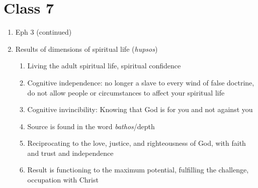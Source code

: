 \documentclass[11pt]{article}
\begin{document}
\section*{Class 7}
\begin{enumerate}
	\item Eph 3 (continued)
	\item Results of dimensions of spiritual life (\emph{hupsos})
	\begin{enumerate}
		\item Living the adult spiritual life, spiritual confidence
		\item Cognitive independence: no longer a slave to every wind of false doctrine, do not allow people or circumstances to affect your spiritual life
		\item Cognitive invincibility: Knowing that God is for you and not against you
		\item Source is found in the word \emph{bathos}/depth
		\item Reciprocating to the love, justice, and righteousness of God, with faith and trust and independence
		\item Result is functioning to the maximum potential, fulfilling the challenge, occupation with Christ 
	\end{enumerate} 
	
\end{enumerate}
\end{document}
